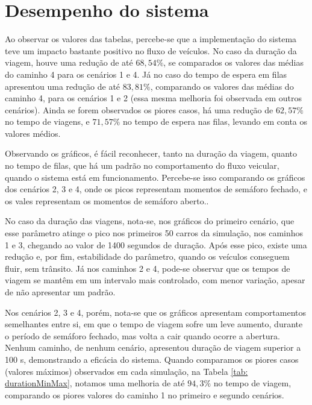\section{Desempenho do sistema}

Ao observar os valores das tabelas, percebe-se que a implementação do sistema teve um impacto bastante positivo no fluxo de veículos. No caso da duração da viagem, houve uma redução de até $68,54\%$, se comparados os valores das médias do caminho 4 para os cenários 1 e 4. Já no caso do tempo de espera em filas apresentou uma redução de até $83,81\%$, comparando os valores das médias do caminho 4, para os cenários 1 e 2 (essa mesma melhoria foi observada em outros cenários). Ainda se forem observados os piores casos, há uma redução de $62,57\%$ no tempo de viagens, e $71,57\%$ no tempo de espera nas filas, levando em conta os valores médios.

Observando os gráficos, é fácil reconhecer, tanto na duração da viagem, quanto no tempo de filas, que há um padrão no comportamento do fluxo veicular, quando o sistema está em funcionamento. Percebe-se isso comparando os gráficos dos cenários 2, 3 e 4, onde os picos representam momentos de semáforo fechado, e os vales representam os momentos de semáforo aberto.. 

No caso da duração das viagens, nota-se, nos gráficos do primeiro cenário, que esse parâmetro atinge o pico nos primeiros 50 carros da simulação, nos caminhos 1 e 3, chegando ao valor de 1400 segundos de duração. Após esse pico, existe uma redução e, por fim, estabilidade do parâmetro, quando os veículos conseguem fluir, sem trânsito.
Já nos caminhos 2 e 4, pode-se observar que os tempos de viagem se mantêm em um intervalo mais controlado, com menor variação, apesar de não apresentar um padrão.

Nos cenários 2, 3 e 4, porém, nota-se que os gráficos apresentam comportamentos semelhantes entre si, em que o tempo de viagem sofre um leve aumento, durante o período de semáforo fechado, mas volta a cair quando ocorre a abertura. Nenhum caminho, de nenhum cenário, apresentou duração de viagem superior a 100 s, demonstrando a eficácia do sistema. 
Quando comparamos os piores casos (valores máximos) observados em cada simulação, na Tabela \ref{tab: durationMinMax}, notamos uma melhoria de até $94,3\%$ no tempo de viagem, comparando os piores valores do caminho 1 no primeiro e segundo cenários.

